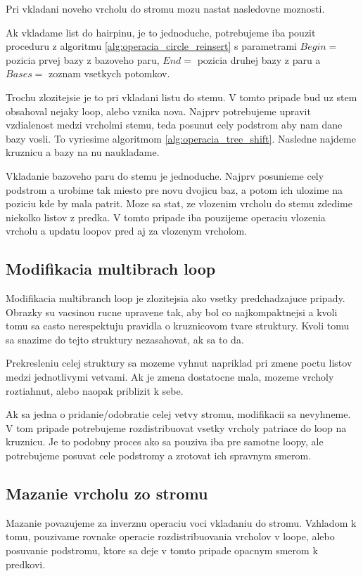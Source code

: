 Pri vkladani noveho vrcholu do stromu mozu nastat nasledovne moznosti.

Ak vkladame list do hairpinu, je to jednoduche, potrebujeme iba pouzit proceduru z algoritmu \ref{alg:operacia_circle_reinsert}
s parametrami $Begin = $ pozicia prvej bazy z bazoveho paru, $End = $ pozicia druhej bazy z paru
a $Bases = $ zoznam vsetkych potomkov.

Trochu zlozitejsie je to pri vkladani listu do stemu. V tomto pripade bud uz stem obsahoval nejaky loop, alebo vznika nova.
Najprv potrebujeme upravit vzdialenost medzi vrcholmi stemu, teda posunut cely podstrom aby nam dane bazy vosli.
To vyriesime algoritmom \ref{alg:operacia_tree_shift}. Nasledne najdeme kruznicu a bazy na nu naukladame.

Vkladanie bazoveho paru do stemu je jednoduche. Najprv posunieme cely podstrom a urobime tak miesto pre novu dvojicu
baz, a potom ich ulozime na poziciu kde by mala patrit. Moze sa stat, ze vlozenim vrcholu do stemu zdedime niekolko
listov z predka. V tomto pripade iba pouzijeme operaciu vlozenia vrcholu a updatu loopov pred aj za vlozenym vrcholom.

\subsection{Modifikacia multibrach loop}

Modifikacia multibranch loop je zlozitejsia ako vsetky predchadzajuce pripady. Obrazky su vacsinou rucne upravene tak,
aby bol co najkompaktnejsi a kvoli tomu sa casto nerespektuju pravidla o kruznicovom tvare struktury.
Kvoli tomu sa snazime do tejto struktury nezasahovat, ak sa to da.

Prekresleniu celej struktury sa mozeme vyhnut napriklad pri zmene poctu listov medzi jednotlivymi vetvami.
Ak je zmena dostatocne mala, mozeme vrcholy roztiahnut, alebo naopak priblizit k sebe.

Ak sa jedna o pridanie/odobratie celej vetvy stromu, modifikacii sa nevyhneme. V tom pripade potrebujeme
rozdistribuovat vsetky vrcholy patriace do loop na kruznicu. Je to podobny proces ako sa pouziva iba pre samotne loopy,
ale potrebujeme posuvat cele podstromy a zrotovat ich spravnym smerom.

\subsection{Mazanie vrcholu zo stromu}

Mazanie povazujeme za inverznu operaciu voci vkladaniu do stromu. Vzhladom k tomu, pouzivame rovnake operacie
rozdistribuovania vrcholov v loope, alebo posuvanie podstromu, ktore sa deje v tomto pripade opacnym smerom
k predkovi.




